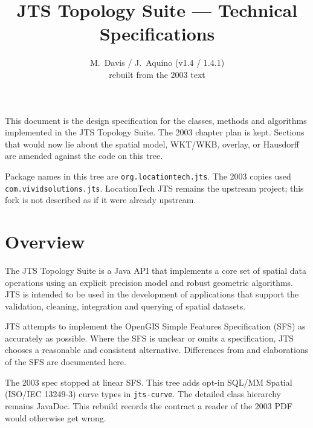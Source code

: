 \documentclass[11pt]{article}
\title{JTS Topology Suite --- Technical Specifications}
\author{M.\ Davis / J.\ Aquino (v1.4 / 1.4.1) \\ rebuilt from the 2003 text}
\date{}
\begin{document}

\noindent
This document is the design specification for the classes, methods
and algorithms implemented in the JTS Topology Suite. The 2003
chapter plan is kept. Sections that would now lie about the spatial
model, WKT/WKB, overlay, or Hausdorff are amended against the code
on this tree.

Package names in this tree are \texttt{org.locationtech.jts}. The
2003 copies used \texttt{com.vividsolutions.jts}. LocationTech JTS
remains the upstream project; this fork is not described as if it
were already upstream.

\clearpage
{}

\tableofcontents
\clearpage

\section{Overview}
The JTS Topology Suite is a Java API that implements a core set of
spatial data operations using an explicit precision model and robust
geometric algorithms. JTS is intended to be used in the development
of applications that support the validation, cleaning, integration
and querying of spatial datasets.

JTS attempts to implement the OpenGIS Simple Features Specification
(SFS) as accurately as possible. Where the SFS is unclear or omits a
specification, JTS chooses a reasonable and consistent alternative.
Differences from and elaborations of the SFS are documented here.

The 2003 spec stopped at linear SFS. This tree adds opt-in
SQL/MM Spatial (ISO/IEC 13249-3) curve types in \texttt{jts-curve}. The detailed
class hierarchy remains JavaDoc. This rebuild records the contract a
reader of the 2003 PDF would otherwise get wrong.
\end{document}
